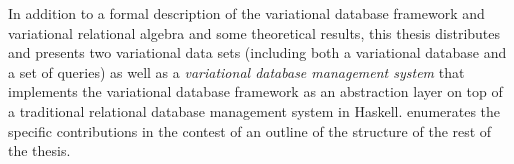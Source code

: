 In addition to a formal description of the variational database framework and
variational relational algebra and some theoretical results,
this thesis distributes and presents two variational data sets (including both a variational
database and a set of queries) as well as a \emph{variational database management system}
that implements the variational database framework as an abstraction layer on top of a 
traditional relational database management system in Haskell.
 enumerates the specific contributions in the contest of an outline
of the structure of the rest of the thesis. 





%


